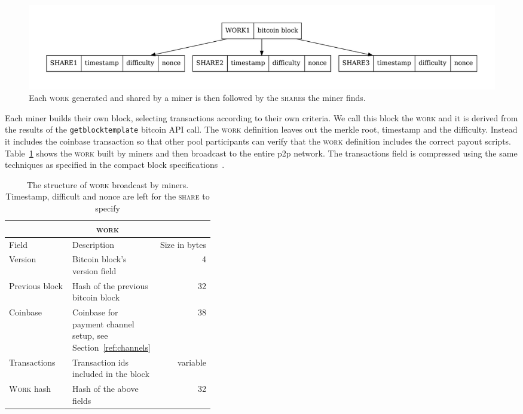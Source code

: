 \documentclass{article}
\begin{document}
\begin{figure}
  \begin{center}
    \includegraphics[width=1\textwidth]{work-share}
    \caption{Each \textsc{work} generated and shared by a miner is then
      followed by the \textsc{share}s the miner finds.}\label{fig:work-share}
    \end{center}
\end{figure}

Each miner builds their own block, selecting transactions according to
their own criteria. We call this block the \textsc{work} and it is
derived from the results of the \verb|getblocktemplate| bitcoin API
call. The \textsc{work} definition leaves out the merkle root,
timestamp and the difficulty. Instead it includes the coinbase
transaction so that other pool participants can verify that the
\textsc{work} definition includes the correct payout
scripts. Table~\ref{table:work} shows the \textsc{work} built by
miners and then broadcast to the entire p2p network. The transactions
field is compressed using the same techniques as specified in the
compact block specifications~\cite{compact-blocks}.

\begin{table}
  \centering
  \begin{tabular}{ lp{0.4\linewidth}r }
    \multicolumn{3}{c}{\textsc{work}} \\
    \hline
    Field & Description & Size in bytes \\
    \hline
    Version & Bitcoin block's version field & 4\\
    Previous block & Hash of the previous bitcoin block & 32 \\
    Coinbase & Coinbase for payment channel setup, see Section~\ref{ref:channels} & 38 \\
    Transactions & Transaction ids included in the block & variable \\
    \textsc{Work} hash & Hash of the above fields & 32 \\
    \hline
  \end{tabular}
  \caption{The structure of \textsc{work} broadcast by
    miners. Timestamp, difficult and nonce are left for the
    \textsc{share} to specify }\label{table:work}
\end{table}
\end{document}
